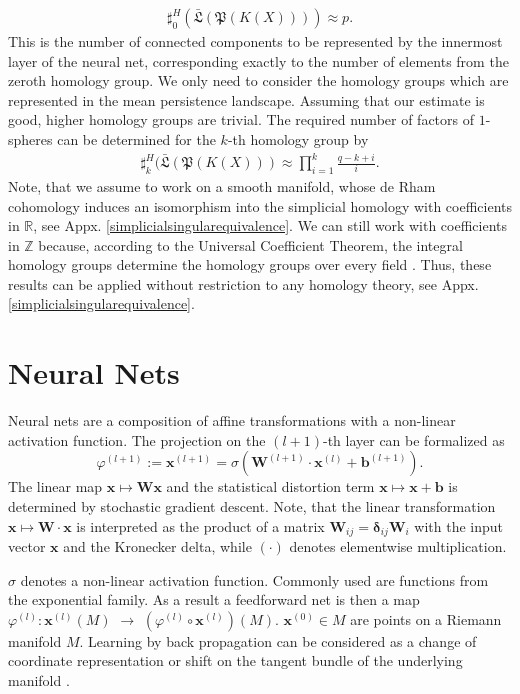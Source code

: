 \documentclass[envcountsect,runningheads]{llncs}
\begin{document}
\begin{align}
	\label{countingsimple}
	\sharp_{0}^{H}(\bar{\mathfrak{L}}(\mathfrak{P}(K(X)))) \approx p.
\end{align}
This is the number of connected components to be represented by the innermost layer of the neural net, corresponding exactly to the number of elements from the zeroth homology group. We only need to consider the homology groups which are represented in the mean persistence landscape. Assuming that our estimate is good, higher homology groups are trivial. The required number of factors of $1$-spheres can be determined for the $k$-th homology group by
\begin{align}
	\label{countingequation}
	\sharp_{k}^{H}(\bar{\mathfrak{L}}(\mathfrak{P}(K(X))) \approx \prod_{i=1}^{k} \frac{q-k+i}{i}.
\end{align}
Note, that we assume to work on a smooth manifold, whose de Rham cohomology induces an isomorphism into the simplicial homology with coefficients in $\mathbb{R}$, see Appx. \ref{simplicialsingularequivalence}. We can still work with coefficients in $\mathbb{Z}$ because, according to the Universal Coefficient Theorem, the integral homology groups determine the homology groups over every field \cite{gruenberg1968universal}. Thus, these results can be applied without restriction to any homology theory, see Appx. \ref{simplicialsingularequivalence}.

\section{Neural Nets}
\label{sec:neuralnettheory}
Neural nets are a composition of affine transformations with a non-linear activation function. The projection on the $(l+1)$-th layer can be formalized as
\begin{equation}
\label{neuralnet}
    \varphi^{(l+1)} := \textbf{x}^{(l+1)} = \sigma(\mathbf{W}^{(l+1)} \cdot \textbf{x}^{(l)}+\textbf{b}^{(l+1)}).
\end{equation}
The linear map $\textbf{x} \mapsto \mathbf{W} \textbf{x}$ and the statistical distortion term $\textbf{x} \mapsto \textbf{x}+\textbf{b}$ is determined by stochastic gradient descent.  Note, that the linear transformation $\textbf{x} \mapsto \mathbf{W} \cdot \textbf{x}$ is interpreted as the product of a matrix $\mathbf{W}_{ij} = \mathbf{\delta}_{ij}\mathbf{W}_i$ with the input vector $\textbf{x}$ and the Kronecker delta, while $(\cdot)$ denotes elementwise multiplication.

$\sigma$ denotes a non-linear activation function. Commonly used are functions from the exponential family. As a result a feedforward net is then a map $\varphi^{(l)}:\textbf{x}^{(l)}(M)$ $\rightarrow$ $\left(\varphi^{(l)}\circ \textbf{x}^{(l)}\right)(M)$. $\textbf{x}^{(0)} \in M$ are points on a Riemann manifold $M$. Learning by back propagation can be considered as a change of coordinate representation or shift on the tangent bundle of the underlying manifold .
\end{document}
